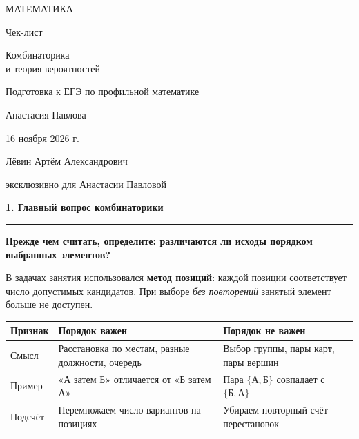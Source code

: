 \documentclass[a4paper,11pt]{article}
\newcommand{\topic}[1]{%
 \Needspace{5\baselineskip}\par\vspace{0.75em}%
 {\large\bfseries\color{darkaccent}#1}\par\vspace{0.35em}%
 {\color{accent}\rule{\linewidth}{0.55pt}}\par\vspace{0.4em}%
}
\newcommand{\keyidea}[1]{\begin{center}\begin{minipage}{0.92\linewidth}\centering\color{darkaccent}\bfseries #1\end{minipage}\end{center}}
\begin{document}
\begin{titlepage}
 \thispagestyle{empty}\centering
 \vspace*{2.45cm}
 {\large\color{darkaccent} МАТЕМАТИКА\par}
 \vspace{1.6cm}
 {\LARGE Чек-лист\par}
 \vspace{1.05cm}
 {\LARGE\color{accent} Комбинаторика\\[3pt] и теория вероятностей\par}
 \vspace{1.15cm}
 {\normalsize Подготовка к ЕГЭ по профильной математике\par}
 \vfill
 {\large Анастасия Павлова\par}
 \vspace{0.75cm}
 {\normalsize 16 ноября 2026 г.\par}
 \vspace{1.30cm}
 {\small Лёвин Артём Александрович\par}
 {\small эксклюзивно для Анастасии Павловой\par}
 \vspace{1.60cm}
 \vspace{0.70cm}
\end{titlepage}

\topic{1. Главный вопрос комбинаторики}
\keyidea{Прежде чем считать, определите: различаются ли исходы порядком выбранных элементов?}

В задачах занятия использовался \textbf{метод позиций}: каждой позиции соответствует число допустимых кандидатов. При выборе \emph{без повторений} занятый элемент больше не доступен.

\begin{center}
\renewcommand{\arraystretch}{1.32}
\begin{tabularx}{\linewidth}{@{}p{.28\linewidth}X X@{}}
\toprule
Признак & Порядок важен & Порядок не важен \\
\midrule
Смысл & Расстановка по местам, разные должности, очередь & Выбор группы, пары карт, пары вершин \\
Пример & «А затем Б» отличается от «Б затем А» & Пара \(\{\text{А},\text{Б}\}\) совпадает с \(\{\text{Б},\text{А}\}\) \\
Подсчёт & Перемножаем число вариантов на позициях & Убираем повторный счёт перестановок \\
\bottomrule
\end{tabularx}
\end{center}
\end{document}
